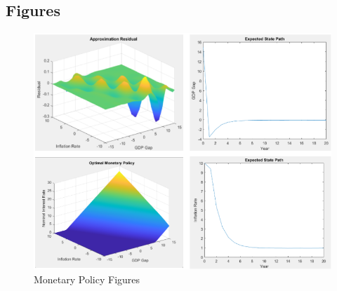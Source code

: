 \documentclass[a4paper,oneside]{article}
\begin{document}
\begin{appendices}
\section{Figures}\label{app:figures}

\begin{figure}
	\includegraphics[width=\columnwidth]{img/Optimal_Monetary_Policy/OMP.png}
	\caption{Monetary Policy Figures}
	\label{fig:myf1}
\end{figure}

\pagebreak


\end{appendices}
\end{document}
